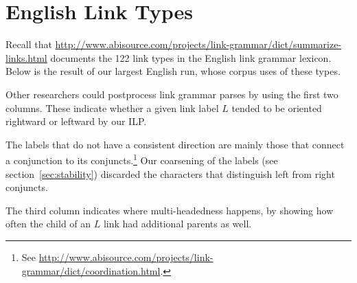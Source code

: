 \documentclass[a4paper,11pt]{article}
\begin{document}
% 
% 

\section{English Link Types}\label{app:linktypes}

Recall that \url{http://www.abisource.com/projects/link-grammar/dict/summarize-links.html} documents the 122 link types in the English link grammar lexicon.  Below is the result of our largest English run, whose corpus uses of these types. 

Other researchers could postprocess link grammar parses by using the first two columns.  These indicate whether a given link label $L$ tended to be oriented rightward or leftward by our ILP.  

The labels that do not have a consistent direction are mainly those that connect a conjunction to its conjuncts.\footnote{See \url{http://www.abisource.com/projects/link-grammar/dict/coordination.html}.}  
Our coarsening of the labels (see section~\ref{sec:stability}) discarded the characters that distinguish left from right conjuncts.

The third column indicates where multi-headedness happens, by showing how often the child of an $L$ link had additional parents as well.
\end{document}

